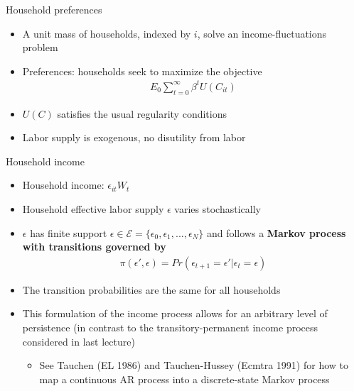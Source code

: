 \documentclass[9pt]{beamer}
\newcommand{\bit}{\begin{itemize}}
\newcommand{\eit}{\end{itemize}}
\begin{document}
\begin{frame}{Household preferences}

\bit
\setlength\itemsep{2em}

\item A unit mass of households, indexed by $i$, solve an income-fluctuations problem

\item Preferences: households seek to maximize the objective
\begin{eqnarray}
E_0 \sum_{t=0}^{\infty} \beta^t U(C_{it}) \nonumber
\end{eqnarray} 

\item $U(C)$ satisfies the usual regularity conditions

\item Labor supply is exogenous, no disutility from labor

\eit

\end{frame}

\begin{frame}{Household income}

\bit
\setlength\itemsep{2em}

\item Household income: $\epsilon_{it} W_t$

\item Household effective labor supply $\epsilon$ varies stochastically

\item $\epsilon$ has finite support $\epsilon \in \mathcal E= \{\epsilon_0, \epsilon_1, ..., \epsilon_N\}$ and follows a \bf Markov process \normalfont with transitions governed by
\begin{eqnarray}
\pi(\epsilon', \epsilon) = Pr(\epsilon_{t+1}= \epsilon' | \epsilon_{t} = \epsilon) \nonumber
\end{eqnarray}

\item The transition probabilities are the same for all households

\item This formulation of the income process allows for an arbitrary level of persistence (in contrast to the transitory-permanent income process considered in last lecture)
\bit
	\item See Tauchen (EL 1986) and Tauchen-Hussey (Ecmtra 1991) for how to map a continuous AR process into a discrete-state Markov process
\eit

\eit

\end{frame}
\end{document}
